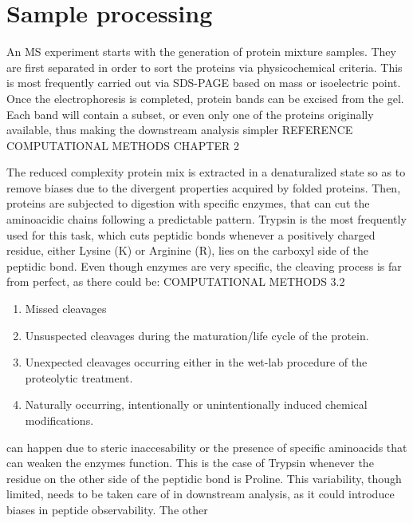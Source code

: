 \documentclass[11pt, a4paper]{report}
\begin{document}
\section{Sample processing}
\label{sec:sample_processing}

An \ac{MS} experiment starts with the generation of protein mixture samples. They are first separated in order to sort the proteins via physicochemical criteria. This is most frequently carried out via SDS-PAGE based on mass or isoelectric point. Once the electrophoresis is completed, protein bands can be excised from the gel. Each band will contain a subset, or even only one of the proteins originally available, thus making the downstream analysis simpler REFERENCE COMPUTATIONAL METHODS CHAPTER 2

The reduced complexity protein mix is extracted in a denaturalized state so as to remove biases due to the divergent properties acquired by folded proteins. Then, proteins are subjected to digestion with specific enzymes, that can cut the aminoacidic chains following a predictable pattern. Trypsin is the most frequently used for this task, which cuts peptidic bonds whenever a positively charged residue, either Lysine (K) or Arginine (R), lies on the carboxyl side of the peptidic bond. Even though enzymes are very specific, the cleaving process is far from perfect, as there could be: COMPUTATIONAL METHODS 3.2

\begin{enumerate}

\item Missed cleavages \label{item:missed_cleavages}

\item Unsuspected cleavages during the maturation/life cycle of the protein.

\item Unexpected cleavages occurring either in the wet-lab procedure of the proteolytic treatment.

\item Naturally occurring, intentionally or unintentionally induced chemical modifications.

\end{enumerate}

 can happen due to steric inaccesability or the presence of specific aminoacids that can weaken the enzyme\textquotesingle s function. This is the case of Trypsin whenever the residue on the other side of the peptidic bond is Proline. This variability, though limited, needs to be taken care of in downstream analysis, as it could introduce biases in peptide observability. The other 
\end{document}
